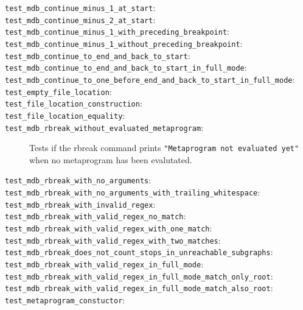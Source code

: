 \begin{description}
    \item[\texttt{test\_mdb\_continue\_minus\_1\_at\_start}:]
    \item[\texttt{test\_mdb\_continue\_minus\_2\_at\_start}:]
    \item[\texttt{test\_mdb\_continue\_minus\_1\_with\_preceding\_breakpoint}:]
    \item[\texttt{test\_mdb\_continue\_minus\_1\_without\_preceding\_breakpoint}:]
    \item[\texttt{test\_mdb\_continue\_to\_end\_and\_back\_to\_start}:]
    \item[\texttt{test\_mdb\_continue\_to\_end\_and\_back\_to\_start\_in\_full\_mode}:]
    \item[\texttt{test\_mdb\_continue\_to\_one\_before\_end\_and\_back\_to\_start\_in\_full\_mode}:]
    \item[\texttt{test\_empty\_file\_location}:]
    \item[\texttt{test\_file\_location\_construction}:]
    \item[\texttt{test\_file\_location\_equality}:]
    \item[\texttt{test\_mdb\_rbreak\_without\_evaluated\_metaprogram}:]
        Tests if the rbreak command prints
        \texttt{"Metaprogram not evaluated yet"} when no metaprogram has been
        evalutated.
    \item[\texttt{test\_mdb\_rbreak\_with\_no\_arguments}:]
    \item[\texttt{test\_mdb\_rbreak\_with\_no\_arguments\_with\_trailing\_whitespace}:]
    \item[\texttt{test\_mdb\_rbreak\_with\_invalid\_regex}:]
    \item[\texttt{test\_mdb\_rbreak\_with\_valid\_regex\_no\_match}:]
    \item[\texttt{test\_mdb\_rbreak\_with\_valid\_regex\_with\_one\_match}:]
    \item[\texttt{test\_mdb\_rbreak\_with\_valid\_regex\_with\_two\_matches}:]
    \item[\texttt{test\_mdb\_rbreak\_does\_not\_count\_stops\_in\_unreachable\_subgraphs}:]
    \item[\texttt{test\_mdb\_rbreak\_with\_valid\_regex\_in\_full\_mode}:]
    \item[\texttt{test\_mdb\_rbreak\_with\_valid\_regex\_in\_full\_mode\_match\_only\_root}:]
    \item[\texttt{test\_mdb\_rbreak\_with\_valid\_regex\_in\_full\_mode\_match\_also\_root}:]
    \item[\texttt{test\_metaprogram\_constuctor}:]

\end{description}
